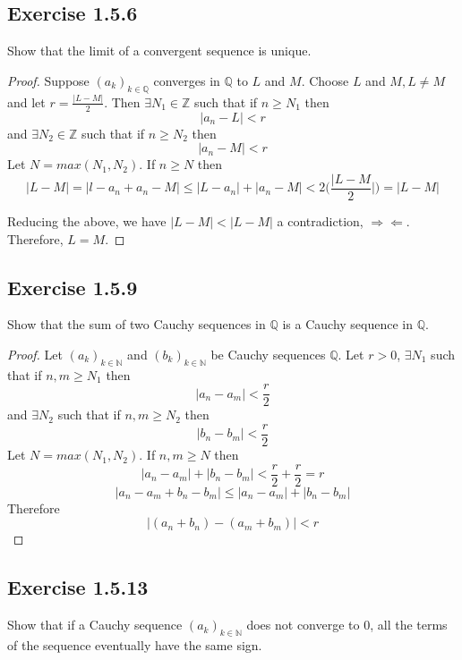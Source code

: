 \documentclass{tufte-book}
\theoremstyle{mytheoremstyle}
\theoremstyle{mylemstyle}
\theoremstyle{mydefstyle}
\begin{document}
\subsection{Exercise 1.5.6}
Show that the limit of a convergent sequence is unique.

\begin{proof}Suppose $(a_k)_{k \in \mathbb{Q}}$ converges in $\mathbb{Q}$ to $L$ and $M$. Choose $L$ and $M , L \neq M$ and let $r=\frac{|L-M|}{2}$. Then $\exists N_1 \in \mathbb{Z}$ such that if $n \geq N_1$ 
then
\[|a_n-L|<r\]
and $\exists N_2 \in \mathbb{Z}$ such that if $n \geq N_2$ then
\[|a_n-M|<r\]
Let $N=max(N_1,N_2)$. If $n \geq N$ then 
\[|L-M| = |l-a_n + a_n - M| \leq |L-a_n| + |a_n-M| < 2(\frac{|L-M}{2}|) = |L-M|\]

Reducing the above, we have $|L-M| < |L-M|$  a contradiction, $\Rightarrow \Leftarrow$.  Therefore, $L=M$.

\end{proof}

\subsection{Exercise 1.5.9}
Show that the sum of two Cauchy sequences in $\mathbb{Q}$ is a Cauchy sequence in $\mathbb{Q}$.

\begin{proof}Let $(a_k)_{k \in \mathbb{N}}$ and $(b_k)_{k \in \mathbb{N}}$ be Cauchy sequences $\mathbb{Q}$. Let $r>0$, $\exists N_1$ such that if $n,m \geq N_1$ then 
\[|a_n - a_m| < \frac{r}{2}\]
and $\exists N_2$ such that if $n,m \geq N_2$ then 
\[|b_n - b_m| < \frac{r}{2}\]
Let $N=max(N_1,N_2)$. If $n,m \geq N$ then
\[|a_n - a_m| + |b_n - b_m| < \frac{r}{2} + \frac{r}{2} = r\]
\[|a_n - a_m + b_n - b_m| \leq |a_n - a_m| + |b_n - b_m|\]
Therefore
\[|(a_n + b_n) - (a_m + b_m)| < r\]

\end{proof}

\subsection{Exercise 1.5.13}
Show that if a Cauchy sequence $(a_k)_{k  \in \mathbb{N}}$ does not converge to $0$, all the terms of the sequence eventually have the same sign.
\end{document}
